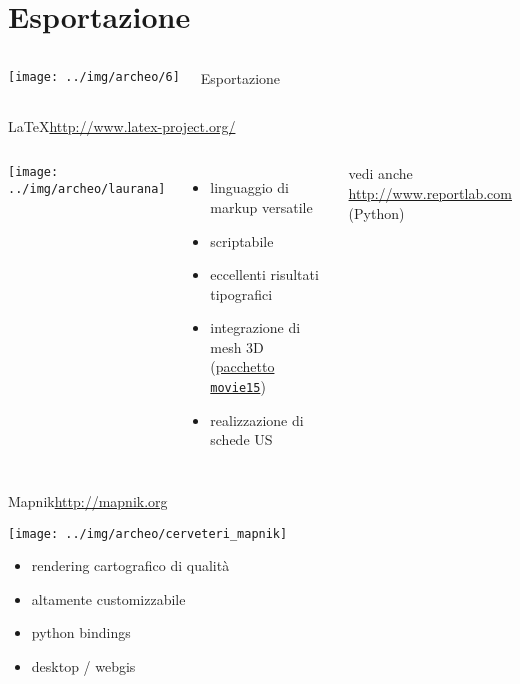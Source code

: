 \documentclass[xcolor=svgnames]{beamer}
\begin{document}
	\section{Esportazione}

		\begin{frame}
			\begin{columns}[c]
					\begin{center}
						\texttt{[image: ../img/archeo/6]}
					\end{center}
					\Huge Esportazione
			\end{columns}
		\end{frame}


		\begin{frame}{\LaTeX}{\url{http://www.latex-project.org/}}
			\begin{columns}[c]
				\column{.5\textwidth}
					\begin{center}
						\texttt{[image: ../img/archeo/laurana]}
					\end{center}
				\column{.5\textwidth}
					\begin{itemize}
						\item linguaggio di markup versatile
						\item scriptabile
						\item eccellenti risultati tipografici
						\item integrazione di mesh 3D (\href{http://ctan.org/tex-archive/macros/latex/contrib/movie15/}{pacchetto \texttt{movie15}})
						\item realizzazione di schede US
					\end{itemize}
					vedi anche \url{http://www.reportlab.com} (Python)
			\end{columns}
		\end{frame}


		\begin{frame}{Mapnik}{\url{http://mapnik.org}}
			\begin{center}
				\texttt{[image: ../img/archeo/cerveteri\_mapnik]}
				\begin{itemize}
					\item rendering cartografico di qualità
					\item altamente customizzabile
					\item python bindings
					\item desktop / webgis
				\end{itemize}
			\end{center}
		\end{frame}
\end{document}
